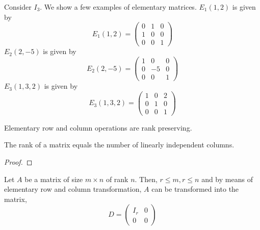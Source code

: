 \begin{Example}
    Consider $I_3$. We show a few examples of elementary matrices.
    $E_1(1,2)$ is given by
    \begin{equation*}
	E_1(1,2) = 
	\begin{pmatrix} 
	    0 & 1 & 0 \\
	    1 & 0 & 0 \\
	    0 & 0 & 1
	\end{pmatrix}
    \end{equation*}
    $E_2(2,-5)$ is given by
    \begin{equation*}
	E_2(2,-5) = 
	\begin{pmatrix} 
	    1 & 0 & 0 \\
	    0 & -5 & 0 \\
	    0 & 0 & 1
	\end{pmatrix}
    \end{equation*}
    $E_3(1,3,2)$ is given by
    \begin{equation*}
	E_3(1,3,2) = 
	\begin{pmatrix} 
	    1 & 0 & 2 \\
	    0 & 1 & 0 \\
	    0 & 0 & 1
	\end{pmatrix}
    \end{equation*}
\end{Example}


\begin{Corollary}
    Elementary row and column operations are rank preserving.
\end{Corollary}
\begin{Theorem}
    The rank of a matrix equals the number of linearly independent columns.
\end{Theorem}
\begin{proof}
\end{proof}
\begin{Theorem}
    Let $A$ be a matrix of size $m\times n$ of rank $n$. Then, $r \leq m, r\leq n$ and by means of elementary
    row and column transformation, $A$ can be transformed into the matrix,
    \begin{equation*}
	D = 
	\begin{pmatrix} 
	    I_r & 0  \\
	    0 & 0  
	\end{pmatrix}
    \end{equation*}
\end{Theorem}


\endinput
